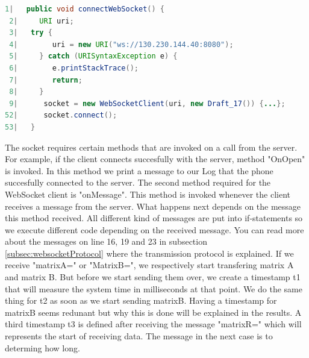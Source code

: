 \documentclass[a4paper, 11pt]{report}
\begin{document}
\begin{lstlisting}[caption={Making a WebSocket client},captionpos=b, label={lst:webSocketClient}, language=java, float=h]
 1|   public void connectWebSocket() {
 2|     URI uri;
 3|   try {
 4|        uri = new URI("ws://130.230.144.40:8080");
 5|     } catch (URISyntaxException e) {
 6|        e.printStackTrace();
 7|        return;
 8|     }
 9|      socket = new WebSocketClient(uri, new Draft_17()) {...};
52|      socket.connect();
53|   }
\end{lstlisting}

The socket requires certain methods that are invoked on a call from the server. For example, if the client connects succesfully with the server, method "OnOpen" is invoked. In this method we print a message to our Log that the phone succesfully connected to the server. The second method required for the WebSocket client is "onMessage". This method is invoked whenever the client receives a message from the server. What happens next depends on the message this method received. All different kind of messages are put into if-statements so we execute different code depending on the received message. You can read more about the messages on line 16, 19 and 23 in subsection \ref{subsec:websocketProtocol} where the transmission protocol is explained. If we receive "matrixA=" or "MatrixB=", we respectively start transfering matrix A and matrix B. But before we start sending them over, we create a timestamp t1 that will measure the system time in milliseconds at that point. We do the same thing for t2 as soon as we start sending matrixB. Having a timestamp for matrixB seems redunant but why this is done will be explained in the results. A third timestamp t3 is defined after receiving the message "matrixR=" which will represents the start of receiving data. The message in the next case is to determing how long.
\end{document}

